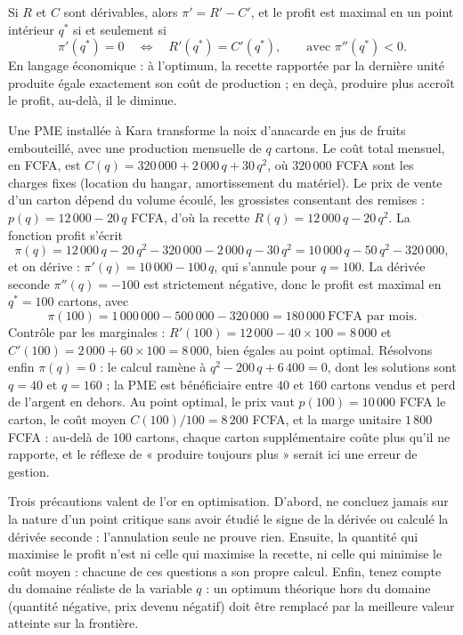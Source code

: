 \begin{propriete}
Si $R$ et $C$ sont dérivables, alors $\pi' = R' - C'$, et le profit est maximal en un point intérieur $q^{*}$ si et seulement si
\[
\pi'(q^{*}) = 0 \quad \Longleftrightarrow \quad R'(q^{*}) = C'(q^{*}), \qquad \text{avec } \pi''(q^{*}) < 0.
\]
En langage économique : à l'optimum, la recette rapportée par la dernière unité produite égale exactement son coût de production ; en deçà, produire plus accroît le profit, au-delà, il le diminue.
\end{propriete}

\begin{exemple}
Une PME installée à Kara transforme la noix d'anacarde en jus de fruits embouteillé, avec une production mensuelle de $q$ cartons. Le coût total mensuel, en FCFA, est $C(q) = 320\,000 + 2\,000\,q + 30\,q^{2}$, où $320\,000$ FCFA sont les charges fixes (location du hangar, amortissement du matériel). Le prix de vente d'un carton dépend du volume écoulé, les grossistes consentant des remises : $p(q) = 12\,000 - 20\,q$ FCFA, d'où la recette $R(q) = 12\,000\,q - 20\,q^{2}$. La fonction profit s'écrit
\[
\pi(q) = 12\,000\,q - 20\,q^{2} - 320\,000 - 2\,000\,q - 30\,q^{2} = 10\,000\,q - 50\,q^{2} - 320\,000,
\]
et on dérive : $\pi'(q) = 10\,000 - 100\,q$, qui s'annule pour $q = 100$. La dérivée seconde $\pi''(q) = -100$ est strictement négative, donc le profit est maximal en $q^{*} = 100$ cartons, avec
\[
\pi(100) = 1\,000\,000 - 500\,000 - 320\,000 = 180\,000 \ \text{FCFA par mois}.
\]
Contrôle par les marginales : $R'(100) = 12\,000 - 40 \times 100 = 8\,000$ et $C'(100) = 2\,000 + 60 \times 100 = 8\,000$, bien égales au point optimal. Résolvons enfin $\pi(q) = 0$ : le calcul ramène à $q^{2} - 200\,q + 6\,400 = 0$, dont les solutions sont $q = 40$ et $q = 160$ ; la PME est bénéficiaire entre $40$ et $160$ cartons vendus et perd de l'argent en dehors. Au point optimal, le prix vaut $p(100) = 10\,000$ FCFA le carton, le coût moyen $C(100)/100 = 8\,200$ FCFA, et la marge unitaire $1\,800$ FCFA : au-delà de $100$ cartons, chaque carton supplémentaire coûte plus qu'il ne rapporte, et le réflexe de « produire toujours plus » serait ici une erreur de gestion.
\end{exemple}

\begin{attention}
Trois précautions valent de l'or en optimisation. D'abord, ne concluez jamais sur la nature d'un point critique sans avoir étudié le signe de la dérivée ou calculé la dérivée seconde : l'annulation seule ne prouve rien. Ensuite, la quantité qui maximise le profit n'est ni celle qui maximise la recette, ni celle qui minimise le coût moyen : chacune de ces questions a son propre calcul. Enfin, tenez compte du domaine réaliste de la variable $q$ : un optimum théorique hors du domaine (quantité négative, prix devenu négatif) doit être remplacé par la meilleure valeur atteinte sur la frontière.
\end{attention}

